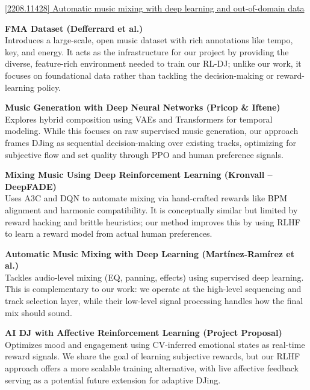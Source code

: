 \documentclass{article}
\begin{document}
\href{https://arxiv.org/abs/2208.11428}{[2208.11428] Automatic music mixing with deep learning and out-of-domain data}\\

\bigskip

\textbf{FMA Dataset (Defferrard et al.)} ~ \\
Introduces a large-scale, open music dataset with rich annotations like tempo, key, and energy. It acts as the infrastructure for our project by providing the diverse, feature-rich environment needed to train our RL-DJ; unlike our work, it focuses on foundational data rather than tackling the decision-making or reward-learning policy.

\bigskip

\textbf{Music Generation with Deep Neural Networks (Pricop \& Iftene)} ~ \\
Explores hybrid composition using VAEs and Transformers for temporal modeling. While this focuses on raw supervised music generation, our approach frames DJing as sequential decision-making over existing tracks, optimizing for subjective flow and set quality through PPO and human preference signals.

\bigskip

\textbf{Mixing Music Using Deep Reinforcement Learning (Kronvall – DeepFADE)} ~ \\
Uses A3C and DQN to automate mixing via hand-crafted rewards like BPM alignment and harmonic compatibility. It is conceptually similar but limited by reward hacking and brittle heuristics; our method improves this by using RLHF to learn a reward model from actual human preferences.

\bigskip

\textbf{Automatic Music Mixing with Deep Learning (Martínez-Ramírez et al.)} ~ \\
Tackles audio-level mixing (EQ, panning, effects) using supervised deep learning. This is complementary to our work: we operate at the high-level sequencing and track selection layer, while their low-level signal processing handles how the final mix should sound.

\bigskip

\textbf{AI DJ with Affective Reinforcement Learning (Project Proposal)} ~ \\
Optimizes mood and engagement using CV-inferred emotional states as real-time reward signals. We share the goal of learning subjective rewards, but our RLHF approach offers a more scalable training alternative, with live affective feedback serving as a potential future extension for adaptive DJing.
\end{document}

